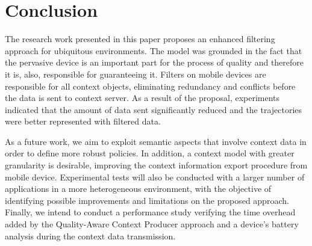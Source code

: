 \documentclass[letterpaper,conference]{IEEEtran}
\begin{document}
\section{Conclusion}

 The research work presented in this paper proposes an enhanced filtering approach for 
 ubiquitous environments. The model was grounded in the fact that the pervasive device 
 is an important part for the process of quality and therefore it is, also, responsible 
 for guaranteeing it. Filters on mobile devices are responsible for all context objects,
 eliminating redundancy and conflicts before the data is sent to context server. As a 
 result of the proposal, experiments indicated that the amount of data sent significantly
 reduced and the trajectories were better represented with filtered data.

 As a future work, we aim to exploit semantic aspects that involve context data in order 
 to define more robust policies. In addition, a context model with greater granularity 
 is desirable, improving the context information export procedure from mobile device. 
 Experimental tests will also be conducted with a larger number of applications 
 in a more heterogeneous environment, with the objective of identifying possible 
 improvements and limitations on the proposed approach. Finally, we intend to conduct a 
 performance study verifying the time overhead added by the Quality-Aware Context 
 Producer approach and a device’s battery analysis during the context data transmission.



\end{document}
